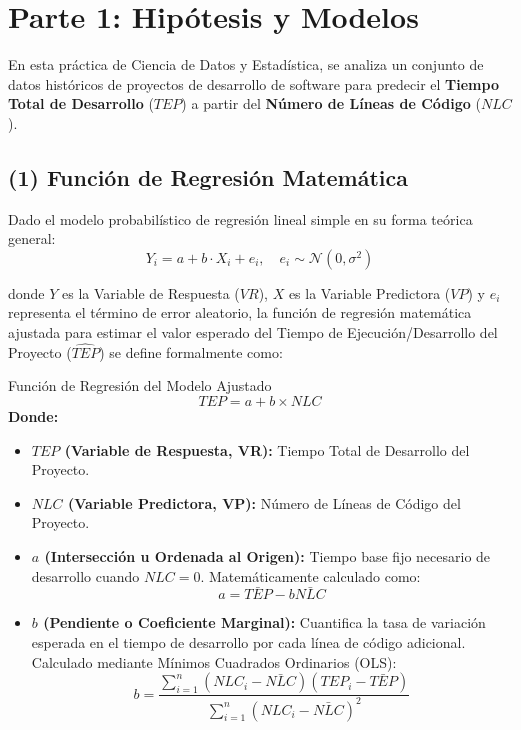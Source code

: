 \documentclass[12pt,letterpaper]{article}
\begin{document}

\newpage

\tableofcontents
\newpage

\section{Parte 1: Hipótesis y Modelos}

En esta práctica de Ciencia de Datos y Estadística, se analiza un conjunto de datos históricos de proyectos de desarrollo de software para predecir el \textbf{Tiempo Total de Desarrollo} ($TEP$) a partir del \textbf{Número de Líneas de Código} ($NLC$).

\subsection{(1) Función de Regresión Matemática}

Dado el modelo probabilístico de regresión lineal simple en su forma teórica general:
\begin{equation}
	Y_i = a + b \cdot X_i + e_i, \quad e_i \sim \mathcal{N}(0, \sigma^2)
\end{equation}

donde $Y$ es la Variable de Respuesta ($VR$), $X$ es la Variable Predictora ($VP$) y $e_i$ representa el término de error aleatorio, la función de regresión matemática ajustada para estimar el valor esperado del Tiempo de Ejecución/Desarrollo del Proyecto ($\hat{TEP}$) se define formalmente como:

\begin{statbox}{Función de Regresión del Modelo Ajustado}
	\begin{equation}
		TEP = a + b \times NLC
	\end{equation}
	\textbf{Donde:}
	\begin{itemize}
		\item \textbf{$TEP$ (Variable de Respuesta, VR):} Tiempo Total de Desarrollo del Proyecto.
		\item \textbf{$NLC$ (Variable Predictora, VP):} Número de Líneas de Código del Proyecto.
		\item \textbf{$a$ (Intersección u Ordenada al Origen):} Tiempo base fijo necesario de desarrollo cuando $NLC = 0$. Matemáticamente calculado como:
		\begin{equation}
			a = \bar{TEP} - b \bar{NLC}
		\end{equation}
		\item \textbf{$b$ (Pendiente o Coeficiente Marginal):} Cuantifica la tasa de variación esperada en el tiempo de desarrollo por cada línea de código adicional. Calculado mediante Mínimos Cuadrados Ordinarios (OLS):
		\begin{equation}
			b = \frac{\sum_{i=1}^{n} (NLC_i - \bar{NLC})(TEP_i - \bar{TEP})}{\sum_{i=1}^{n} (NLC_i - \bar{NLC})^2}
		\end{equation}
	\end{itemize}
\end{statbox}
\end{document}
